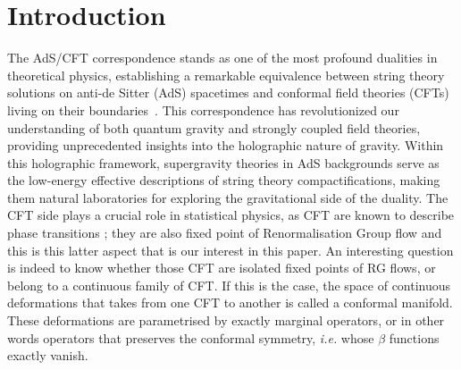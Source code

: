 \documentclass[11pt,a4paper]{article}
\newcommand{\ce}[1]{\marginpar{\parbox{\marginparwidth}{\boldmath $\Longleftarrow$}}{\boldmath\bfseries (ce: #1)}}
\begin{document}
\tableofcontents



\section{Introduction}

The AdS/CFT correspondence stands as one of the most profound dualities in theoretical physics, establishing a remarkable equivalence between string theory solutions on anti-de Sitter (AdS) spacetimes and conformal field theories (CFTs) living on their boundaries~\cite{Maldacena:1997re}. This correspondence has revolutionized our understanding of both quantum gravity and strongly coupled field theories, providing unprecedented insights into the holographic nature of gravity. Within this holographic framework, supergravity theories in AdS backgrounds serve as the low-energy effective descriptions of string theory compactifications, making them natural laboratories for exploring the gravitational side of the duality. The CFT side plays a crucial role in statistical physics, as CFT are known to describe phase transitions ; they are also fixed point of Renormalisation Group flow and this is this latter aspect that is our interest in this paper. An interesting question is indeed to know whether those CFT are isolated fixed points of RG flows, or belong to a continuous family of CFT. If this is the case, the space of continuous deformations that takes from one CFT to another is called a conformal manifold. These deformations are parametrised by exactly marginal operators, or in other words operators that preserves the conformal symmetry, \textit{i.e.} whose $\beta$ functions exactly vanish. %
\end{document}
